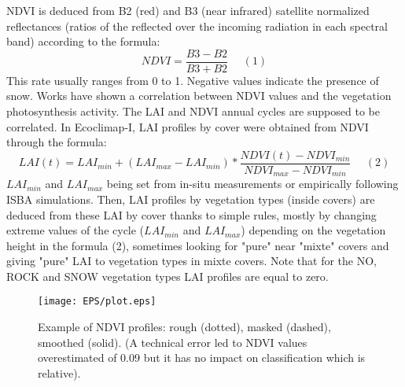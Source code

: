 NDVI is deduced from B2 (red) and B3 (near infrared) satellite normalized reflectances (ratios of the reflected over the incoming radiation 
in each spectral band) 
according to the formula: 
\begin{displaymath}
NDVI=\frac{B3-B2}{B3+B2}~~~~~~(1)
\end{displaymath}
This rate usually ranges from 0 to 1. Negative values indicate the presence of snow. Works have shown a correlation between NDVI values and the 
vegetation photosynthesis activity. The LAI and NDVI annual cycles are supposed to be correlated. In Ecoclimap-I, 
LAI profiles by cover were obtained from NDVI through the formula: 
\begin{displaymath}
LAI(t)=LAI_{min}+(LAI_{max}-LAI_{min})*\frac{NDVI(t)-NDVI_{min}}{NDVI_{max}-NDVI_{min}}~~~~~~(2)
\end{displaymath} 
$LAI_{min}$ and $LAI_{max}$ being set from in-situ measurements or empirically following ISBA simulations. Then, LAI profiles by vegetation types 
(inside covers) are deduced from these LAI by cover thanks to simple rules, mostly by changing extreme values of the cycle ($LAI_{min}$ and $LAI_{max}$) 
depending on the vegetation height in the formula (2), sometimes looking for "pure" near "mixte" covers and giving "pure" LAI to 
vegetation types in mixte covers. Note that for the NO, ROCK and SNOW vegetation types LAI profiles are equal to zero. \\

 
\begin{figure}
\begin{center}
\texttt{[image: EPS/plot.eps]}
\caption{\label{figure1} Example of NDVI profiles: rough (dotted), masked (dashed), smoothed (solid). 
(A technical error led to NDVI values overestimated of 0.09 but it has no impact on classification which is relative). }
\end{center}
\end{figure}

